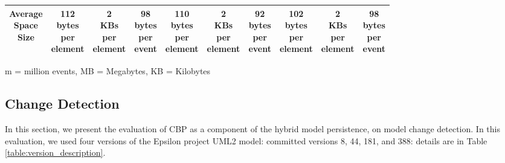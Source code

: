 \documentclass{llncs}
\begin{document}
\begin{table} [ht]
\begin{footnotesize}
\begin{tabular}{| c | c  c  c | c c c | c c c |}
\makecell{Average\\Space\\Size} & \makecell{112\\bytes\\per\\element} & \makecell{2\\KBs\\per\\element}  & \makecell{98 \\bytes\\per\\event} & \makecell{110\\bytes\\per\\element} & \makecell{2\\KBs\\per\\element} & \makecell{92\\bytes\\per\\event} & \makecell{102\\bytes\\per\\element} & \makecell{2\\KBs\\per\\element} & \makecell{98\\bytes\\per\\event} \\
\hline 
\end{tabular}
\justify
m = million events, MB = Megabytes, KB = Kilobytes
\end{footnotesize}
\end{table}

\subsection{Change Detection}
\label{sec:change_detection}
In this section, we present the evaluation of CBP as a component of the hybrid model persistence, on model change detection. In this evaluation, we used four versions of the Epsilon project UML2 model: committed versions 8, 44, 181, and 388: details are in Table \ref{table:version_description}.
\end{document}
